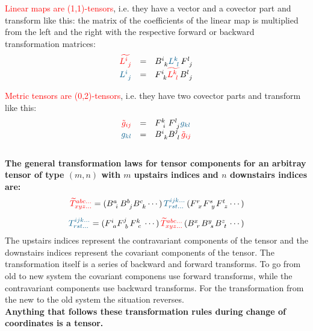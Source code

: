 \textcolor{red}{Linear maps are (1,1)-tensors}, i.e. they have a vector and a covector
part and transform like this: the matrix of the coefficients of the linear map is
multiplied from the left and the right with the respective forward or backward
transformation matrices:
\begin{equation}
    \begin{array}{rcl}
        \textcolor{red}{\widetilde{L^{i~}_{~j}}} & = &
        B^{i~}_{~k} \textcolor{MidnightBlue}{L^{k~}_{~l}} F^{l~}_{~j} \\
        \textcolor{MidnightBlue}{L^{i~}_{~j}} & = &
        F^{i~}_{~k} \textcolor{red}{\widetilde{L^{k~}_{~l}}} B^{l~}_{~j}
    \end{array}
\end{equation}

\textcolor{red}{Metric tensors are (0,2)-tensors}, i.e. they have two covector parts and
transform like this:
\begin{equation}
    \begin{array}{rcl}
        \textcolor{red}{\tilde{g}_{ij}} & = &
        F^{k~}_{~i}  F^{l~}_{~j} \textcolor{MidnightBlue}{{g}_{kl}} \\
        \textcolor{MidnightBlue}{g_{kl}} & = &
        B^{i~}_{~k} B^{j~}_{~l} \textcolor{red}{\tilde{g}_{ij}}
    \end{array}
\end{equation} \\

\textbf{The general transformation laws for tensor components for an arbitray tensor of type
$(m,n)$ with $m$ upstairs indices and $n$ downstairs indices are:}
\begin{equation}
    \begin{array}{rcl}
        \textcolor{red}{\widetilde{T}^{abc...}_{xyz...}} =
            (B^{a~}_{~i} B^{b~}_{~j} B^{c~}_{~k} \cdots)
            \,\textcolor{MidnightBlue}{T^{ijk...}_{rst...}}\,
            (F^{r~}_{~x} F^{s~}_{~y} F^{t~}_{~z} \cdots) \\
        \noalign{\vskip10pt}
        \textcolor{MidnightBlue}{T^{ijk...}_{rst...}} =
            (F^{i~}_{~a} F^{j~}_{~b} F^{k~}_{~c} \cdots)
            \,\textcolor{red}{\widetilde{T}^{abc...}_{xyz...}}\,
            (B^{x~}_{~r} B^{y~}_{~s} B^{z~}_{~t} \cdots)
    \end{array}
\end{equation}
The upstairs indices represent the contravariant components of the tensor and the
downstairs indices represent the covariant components of the tensor. The transformation
itself is a series of backward and forward transforms. To go from old to new system the
covariant componens use forward transforms, while the contravariant components use
backward transforms. For the transformation from the new to the old system the situation
reverses. \\

\textbf{Anything that follows these transformation rules during change of coordinates
is a tensor.}


\newpage